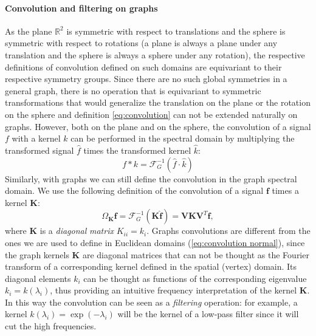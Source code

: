 \paragraph{Convolution and filtering on graphs}
 As the plane $\mathbb R^2$ is symmetric with respect to translations and the sphere is symmetric with respect to rotations (a plane is always a plane under any translation and the sphere is always a sphere under any rotation), the respective definitions of convolution defined on such domains are equivariant to their respective symmetry groups. Since there are no such global symmetries in a general graph, there is no operation that is equivariant to symmetric transformations that would generalize the translation on the plane or the rotation on the sphere and definition \ref{eq:convolution} can not be extended naturally on graphs. However, both on the plane and on the sphere, the convolution of a signal $f$ with a kernel $k$ can be performed in the spectral domain by multiplying the transformed signal $\hat f$ times the transformed kernel $\hat k$: 
\begin{equation}\label{eq:convolution normal}
f*k = \mathcal F^{-1}_G(\hat f \cdot \hat k)
\end{equation}
Similarly, with graphs we can still define the convolution in the graph spectral domain. We use the following definition \cite{Vandergheynst} of the convolution of a signal $\mathbf f$ times a kernel $\mathbf K$:
\begin{equation}\label{eq:graph convolution}
	\Omega_\mathbf K\mathbf f = \mathcal{F}^{-1}_G(\mathbf K \hat {\mathbf f})= \mathbf V\mathbf K  \mathbf V^T {\mathbf f},
\end{equation}
where $\mathbf K$ is a \textit{diagonal} \textit{matrix} $K_{ii} = k_i$. Graphs convolutions are different from the ones we are used to define in Euclidean domains (\ref{eq:convolution normal}), since the graph kernels $\mathbf K$ are diagonal matrices that can not be thought as the Fourier transform of a corresponding kernel defined in the spatial (vertex) domain.
Its diagonal elements $k_{i}$ can be thought as functions of the corresponding eigenvalue $k_{i}= k(\lambda_i)$, thus providing an intuitive frequency interpretation of the kernel $\mathbf K$. In this way the convolution can be seen as a \textit{filtering} operation: for example, a kernel $k(\lambda_i) = \exp (-\lambda_i)$ will be the kernel of a low-pass filter since it will cut the high frequencies.
